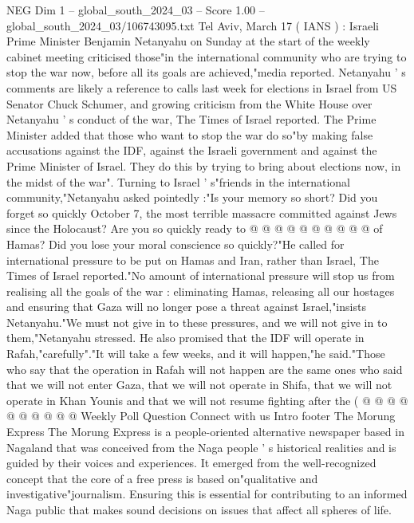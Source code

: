 \begin{textsample}{NEG Dim 1 – global\_south\_2024\_03 – Score 1.00 – global\_south\_2024\_03/106743095.txt}  \label{ex:f1_neg_432}
Tel Aviv, March 17 ( IANS ) : Israeli Prime Minister Benjamin Netanyahu on Sunday at the start of the weekly cabinet meeting criticised those"in the international community who are trying to stop the war now, before all its goals are achieved,"media reported.
Netanyahu ' s comments are likely a reference to calls last week for elections in Israel from US Senator Chuck Schumer, and growing criticism from the White House over Netanyahu ' s conduct of the war, The Times of Israel reported.
The Prime Minister added that those who want to stop the war do so"by making false accusations against the IDF, against the Israeli government and against the Prime Minister of Israel.
They do this by trying to bring about elections now, in the midst of the war".
Turning to Israel ' s"friends in the international community,"Netanyahu asked pointedly :"Is your memory so short?
Did you forget so quickly October 7, the most terrible massacre committed against Jews since the Holocaust?
Are you so quickly ready to @ @ @ @ @ @ @ @ @ @ of Hamas?
Did you lose your moral conscience so quickly?"He called for international pressure to be put on Hamas and Iran, rather than Israel, The Times of Israel reported."No amount of international pressure will stop us from realising all the goals of the war : eliminating Hamas, releasing all our hostages and ensuring that Gaza will no longer pose a threat against Israel,"insists Netanyahu."We must not give in to these pressures, and we will not give in to them,"Netanyahu stressed.
He also promised that the IDF will operate in Rafah,"carefully"."It will take a few weeks, and it will happen,"he said."Those who say that the operation in Rafah will not happen are the same ones who said that we will not enter Gaza, that we will not operate in Shifa, that we will not operate in Khan Younis and that we will not resume fighting after the ( @ @ @ @ @ @ @ @ @ @ Weekly Poll Question Connect with us Intro footer The Morung Express The Morung Express is a people-oriented alternative newspaper based in Nagaland that was conceived from the Naga people ' s historical realities and is guided by their voices and experiences.
It emerged from the well-recognized concept that the core of a free press is based on"qualitative and investigative"journalism.
Ensuring this is essential for contributing to an informed Naga public that makes sound decisions on issues that affect all spheres of life.

\end{textsample}
